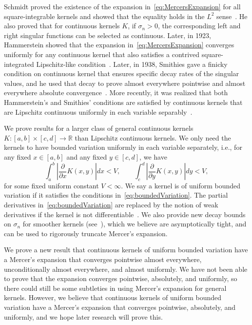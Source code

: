 \documentclass{article}
\begin{document}
Schmidt proved the existence of the expansion in~\cref{eq:MercersExpansion} for all square-integrable kernels and showed that the equality holds in the $L^2$ sense~\citep{schmidt1907theorie}. He also proved that for continuous kernels $K$, if $\sigma_n>0$, the corresponding left and right singular functions can be selected as continuous. Later, in 1923, Hammerstein showed that the expansion in~\cref{eq:MercersExpansion} converges uniformly for any continuous kernel that also satisfies a contrived square-integrated Lipschitz-like condition~\citep{hammerstein1923entwickelung}. Later, in 1938, Smithies gave a finicky condition on continuous kernel that ensures specific decay rates of the singular values, and he used that decay to prove almost everywhere pointwise and almost everywhere absolute convergence~\citep{smithies1938eigen}. More recently, it was realized that both Hammerstein's and Smithies' conditions are satisfied by continuous kernels that are Lipschitz continuous uniformly in each variable separably~\citep{townsend2014computing}. 

We prove results for a larger class of general continuous kernels $K:[a,b]\times [c,d]\rightarrow \mathbb{R}$ than Lipschitz continuous kernels. We only need the kernels to have bounded variation uniformly in each variable separately, i.e., for any fixed $x\in[a,b]$ and any fixed $y\in[c,d]$, we have 
\begin{equation} 
\int_a^b \left|\frac{\partial}{\partial x}K(x,y)\right|dx <V, \qquad \int_c^d \left|\frac{\partial}{\partial y}K(x,y)\right|dy <V,
\label{eq:boundedVariation}
\end{equation} 
for some fixed uniform constant $V<\infty$. We say a kernel is of uniform bounded variation if it satisfies the conditions in~\cref{eq:boundedVariation}. The partial derivatives in~\cref{eq:boundedVariation} are replaced by the notion of weak derivatives if the kernel is not differentiable~\citep[Chap.~7]{trefethen2019approximation}. We also provide new decay bounds on $\sigma_n$ for smoother kernels (see~), which we believe are asymptotically tight, and can be used to rigorously truncate Mercer's expansion. 

We prove a new result that continuous kernels of uniform bounded variation have a Mercer's expansion that converges pointwise almost everywhere, unconditionally almost everywhere, and almost uniformly. We have not been able to prove that the expansion converges pointwise, absolutely, and uniformly, so there could still be some subtleties in using Mercer's expansion for general kernels. However, we believe that continuous kernels of uniform bounded variation have a Mercer's expansion that converges pointwise, absolutely, and uniformly, and we hope later research will prove this. 
\end{document}
